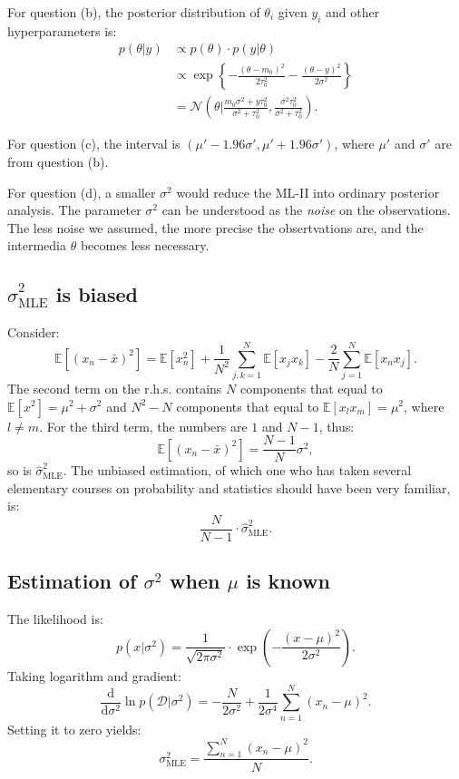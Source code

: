 \documentclass[UTF8]{ctexart}
\begin{document}
For question (b), the posterior distribution of $\theta_{i}$ given $y_{i}$ and other hyperparameters is:
$$
\begin{aligned}
p(\theta|y)&\propto p(\theta)\cdot p(y|\theta)\\
&\propto \exp\left\{-\frac{(\theta-m_{0})^{2}}{2\tau^{2}_{0}}-\frac{(\theta-y)^{2}}{2\sigma^{2}} \right\}\\
&=\mathcal{N}(\theta|\frac{m_{0}\sigma^{2}+y\tau_{0}^{2}}{\sigma^{2}+\tau_{0}^{2}},\frac{\sigma^{2}\tau_{0}^{2}}{\sigma^{2}+\tau_{0}^{2}}).
\end{aligned}
$$

For question (c), the interval is $(\mu'-1.96\sigma',\mu'+1.96\sigma')$, where $\mu'$ and $\sigma'$ are from question (b).

For question (d), a smaller $\sigma^{2}$ would reduce the ML-II into ordinary posterior analysis.
The parameter $\sigma^{2}$ can be understood as the \emph{noise} on the observations.
The less noise we assumed, the more precise the obsertvations are, and the intermedia $\theta$ becomes less necessary.

\subsection{$\hat{\sigma}^{2}_{\text{MLE}}$ is biased}
Consider:
$$\mathbb{E}[(x_{n}-\bar{x})^{2}]=\mathbb{E}[x_{n}^{2}]+\frac{1}{N^{2}}\sum_{j,k=1}^{N}\mathbb{E}[x_{j}x_{k}]-\frac{2}{N}\sum_{j=1}^{N}\mathbb{E}[x_{n}x_{j}].$$
The second term on the r.h.s. contains $N$ components that equal to $\mathbb{E}[x^{2}]=\mu^{2}+\sigma^{2}$ and $N^{2}-N$ components that equal to $\mathbb{E}[x_{l}x_{m}]=\mu^{2}$, where $l\neq m$.
For the third term, the numbers are $1$ and $N-1$, thus:
$$\mathbb{E}[(x_{n}-\bar{x})^{2}]=\frac{N-1}{N}\sigma^{2},$$
so is $\hat{\sigma}^{2}_{\text{MLE}}$.
The unbiased estimation, of which one who has taken several elementary courses on probability and statistics should have been very familiar, is:
$$\frac{N}{N-1}\cdot \hat{\sigma}^{2}_{\text{MLE}}.$$

\subsection{Estimation of $\sigma^{2}$ when $\mu$ is known}
The likelihood is:
$$p(x|\sigma^{2})=\frac{1}{\sqrt{2\pi\sigma^{2}}}\cdot\exp\left(-\frac{(x-\mu)^{2}}{2\sigma^{2}} \right).$$
Taking logarithm and gradient:
$$\frac{\text{d}}{\text{d}\sigma^{2}}\ln p(\mathcal{D}|\sigma^{2})=-\frac{N}{2\sigma^{2}}+\frac{1}{2\sigma^{4}}\sum_{n=1}^{N}(x_{n}-\mu)^{2}.$$
Setting it to zero yields:
$$\sigma_{\text{MLE}}^{2}=\frac{\sum_{n=1}^{N}(x_{n}-\mu)^{2}}{N}.$$
\end{document}
